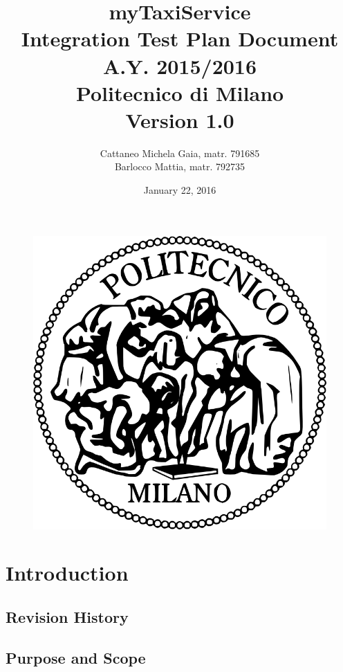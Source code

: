 \documentclass[18pt,oneside,a4paper, titlepage]{article}
\begin{document}
\begin{figure}[t]
	\centering
	\includegraphics[scale=0.35]{logo-polimi.png}
\end{figure}
\title{\textbf{myTaxiService}\\\textbf{I}ntegration \textbf{T}est \textbf{P}lan \textbf{D}ocument\\ A.Y. 2015/2016\\
	Politecnico di Milano \\ Version 1.0}	
\author{Cattaneo Michela Gaia, matr. 791685\\Barlocco Mattia, matr. 792735 }
\date{January 22, 2016}
\maketitle

\newpage
	\tableofcontents

\newpage
\section{Introduction}
\subsection{Revision History}
\subsection{Purpose	and	Scope} %
\end{document}
